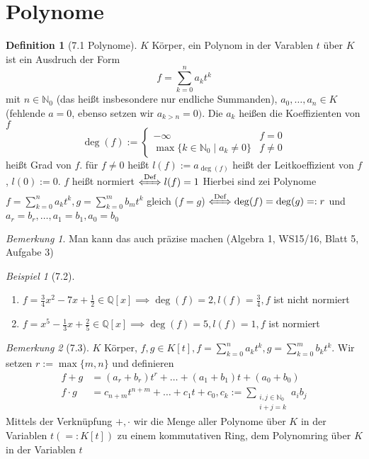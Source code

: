 \documentclass[a4paper]{scrartcl}
\theoremstyle{definition}
\newtheorem{defn}{Definition}
\theoremstyle{plain}
\theoremstyle{plain}
\theoremstyle{remark}
\newtheorem{remark}{Bemerkung}
\theoremstyle{remark}
\theoremstyle{remark}
\theoremstyle{remark}
\theoremstyle{remark}
\newtheorem{ex}{Beispiel}
\begin{document}
\section{Polynome}
\label{sec-4}
\begin{defn}[7.1 Polynome]
$K$ Körper, ein Polynom in der Varablen $t$ über $K$ ist ein Ausdruch der Form
\[f = \sum_{k = 0}^n a_k t^k\]
mit $n\in\mathbb{N}_0$ (das heißt insbesondere nur endliche Summanden), $a_0,\ldots,a_n \in K$ (fehlende $a = 0$, ebenso setzen wir $a_{k > n} = 0)$. Die $a_k$ heißen die Koeffizienten von $f$
\[\deg(f) := \begin{cases}-\infty & f = 0 \\  \max\{k\in\mathbb{N}_0 \mid a_k \neq 0\} & f\neq 0\end{cases}\]
heißt Grad von $f$. für $f\neq 0$ heißt $l(f) := a_{\deg(f)}$ heißt der Leitkoeffizient von $f$, $l(0) := 0$. $f$ heißt normiert $\xLeftrightarrow{\text{Def}} l(f) = 1$
Hierbei sind zei Polynome $f = \sum_{k = 0}^n a_k t^k,g = \sum_{k =0}^m b_m t^k$ gleich ($f = g$) $\xLeftrightarrow{\text{Def}} \deg(f) = \deg(g) =: r$ und $a_r = b_r,\ldots,a_1 = b_1, a_0 = b_0$
\end{defn}
\begin{remark}
Man kann das auch präzise machen (Algebra 1, WS15/16, Blatt 5, Aufgabe 3)
\end{remark}
\begin{ex}[7.2] \mbox{}
\begin{enumerate}
\item $f = \frac{3}{4}x^2 - 7 x + \frac{1}{2} \in \mathbb{Q}[x] \implies \deg(f) = 2, l(f) = \frac{3}{4}, f$ ist nicht normiert
\item $f = x^5 - \frac{1}{3} x + \frac{2}{5} \in\mathbb{Q}[x] \implies \deg(f) = 5, l(f) = 1, f$ ist normiert
\end{enumerate}
\end{ex}
\begin{remark}[7.3]
$K$ Körper, $f,g \in K[t], f = \sum_{k = 0}^n a_k t^k, g = \sum_{k = 0}^m b_k t^k$. Wir setzen $r:= \max\{m,n\}$ und definieren
\begin{align*}
f + g &= (a_r + b_r)t^r + \ldots + (a_1 + b_1)t + (a_0 + b_0) \\
f \cdot g &= c_{n + m} t^{n + m} + \ldots + c_1 t + c_0, c_k := \sum_{\substack{i,j \in\mathbb{N}_0 \\ i + j = k}} a_i b_j
\end{align*}
Mittels der Verknüpfung $+,\cdot$ wir die Menge aller Polynome über $K$ in der Variablen $t (=: K[t])$ zu einem kommutativen Ring, dem Polynomring über $K$ in der Variablen $t$
\end{remark}
\end{document}
